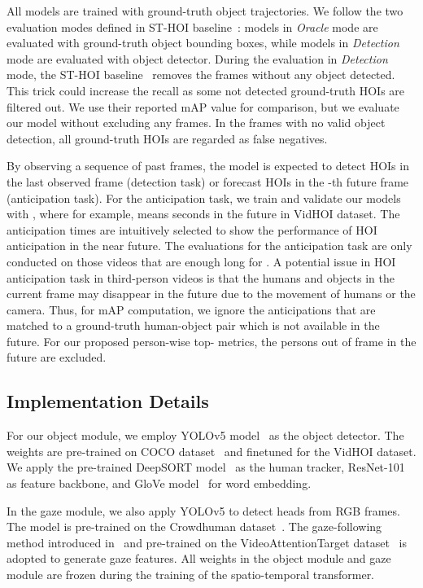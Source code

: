 \documentclass[times,twocolumn,final,authoryear]{elsarticle}
\begin{document}
All models are trained with ground-truth object trajectories. We follow the two evaluation modes defined in ST-HOI baseline~\citep{hoi_v_set:VidHOI}: models in \emph{Oracle} mode are evaluated with ground-truth object bounding boxes, while models in \emph{Detection} mode are evaluated with object detector. During the evaluation in \emph{Detection} mode, the ST-HOI baseline~\citep{hoi_v_set:VidHOI} removes the frames without any object detected. This trick could increase the recall as some not detected ground-truth HOIs are filtered out. We use their reported mAP value for comparison, but we evaluate our model without excluding any frames. In the frames with no valid object detection, all ground-truth HOIs are regarded as false negatives.

By observing a sequence of past  frames, the model is expected to detect HOIs in the last observed frame (detection task) or forecast HOIs in the -th future frame (anticipation task). For the anticipation task, we train and validate our models with , where for example,  means  seconds in the future in VidHOI dataset. The anticipation times are intuitively selected to show the performance of HOI anticipation in the near future. The evaluations for the anticipation task are only conducted on those videos that are enough long for . A potential issue in HOI anticipation task in third-person videos is that the humans and objects in the current frame may disappear in the future due to the movement of humans or the camera. Thus, for mAP computation, we ignore the anticipations that are matched to a ground-truth human-object pair which is not available in the future. For our proposed person-wise top- metrics, the persons out of frame in the future are excluded.





\subsection{Implementation Details}
For our object module, we employ YOLOv5 model~\citep{detection:yolov5} as the object detector. The weights are pre-trained on COCO dataset~\citep{detection:COCO} and finetuned for the VidHOI dataset. We apply the pre-trained DeepSORT model~\citep{tracking:deepsort} as the human tracker, ResNet-101~\citep{cnn:ResNet} as feature backbone, and GloVe model~\citep{semantic:glove} for word embedding. 

In the gaze module, we also apply YOLOv5 to detect heads from RGB frames. The model is pre-trained on the Crowdhuman dataset~\citep{detection:crowdhuman}. The gaze-following method introduced in~\citep{gaze:detecting_attended} and pre-trained on the VideoAttentionTarget dataset~\citep{gaze:detecting_attended} is adopted to generate gaze features. All weights in the object module and gaze module are frozen during the training of the spatio-temporal transformer. 
\end{document}
